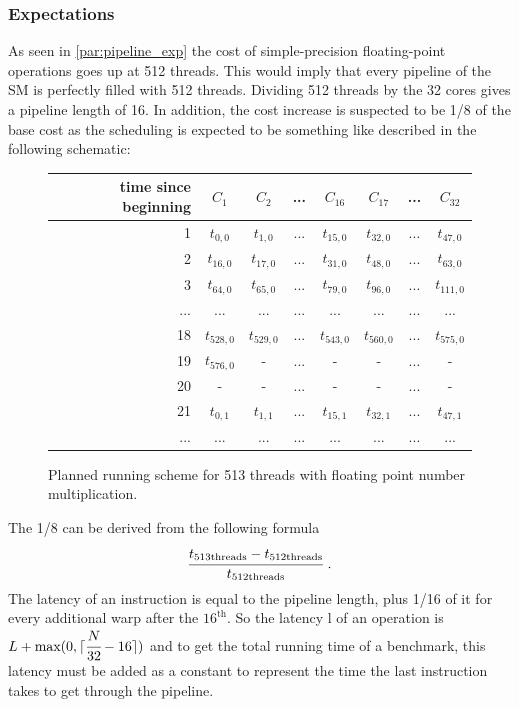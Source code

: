 \documentclass{report}
\DeclarePairedDelimiter\ceil{\lceil}{\rceil}
\begin{document}
	\subsubsection{Expectations}
	As seen in \ref{par:pipeline_exp} the cost of simple-precision floating-point
    operations goes up at 512 threads. This would imply that every pipeline of
    the SM is perfectly filled with 512 threads. Dividing 512 threads by
    the 32 cores gives a pipeline length of 16. In addition, the cost increase
    is suspected to be 1/8 of the base cost as the scheduling is expected to be
    something like described in the following schematic:
    
    \begin{figure}[H]
      \centering
       \begin{tabular}{ | r || c | c | c | c || c | c | c | }
    	    \hline
    	    time since beginning & $C_1$ & $C_2$ & ... & $C_{16}$ & $C_{17}$ & ... & $C_{32}$ \\ \hline  \hline
    	   1 & $t_{0,0}$ & $t_{1,0}$ & ... & $t_{15,0}$ & $t_{32, 0}$ & ... & $t_{47, 0}$ \\ \hline 
    	   2 & $t_{16,0}$ & $t_{17,0}$ & ... & $t_{31,0}$ & $t_{48, 0}$ & ... & $t_{63, 0}$ \\ \hline
    	   3 & $t_{64,0}$ & $t_{65,0}$ & ... & $t_{79,0}$ & $t_{96, 0}$ & ... & $t_{111, 0}$ \\ \hline
    	   ... & ... & ... & ... & ... & ... & ... & ... \\ \hline
    	   18 & $t_{528,0}$ & $t_{529,0}$ & ... & $t_{543,0}$ & $t_{560,0}$ & ... & $t_{575, 0}$ \\ \hline
    	   19 & $t_{576,0}$ & - & ... & - & - & ... & - \\ \hline
    	   20 & - & - & ... & - & - & ... & - \\ \hline
    	   21 & $t_{0,1}$ & $t_{1,1}$ & ... & $t_{15,1}$ & $t_{32,1}$ & ... & $t_{47,1}$ \\ \hline
    	   ... & ... & ... & ... & ... & ... & ... & ... \\ \hline
  	\end{tabular}
  	\captionsetup{justification=centering}
  	\caption{Planned running scheme for 513 threads with floating point number multiplication.}
  	\label{fig:fp_prediction_513}
   \end{figure}

    The 1/8 can be derived from the following formula
    \[ \cfrac{t_{\text{513threads}} - t_{\text{512threads}}}{t_{\text{512threads}}} \text{  .}\]
    The latency of an instruction is equal to the pipeline length, plus 1/16 of
    it for every additional warp after the $16^{\text{th}}$. So the latency l of an 
    operation is $L + \text{max}(0, \ceil{\cfrac{N}{32} -16})$ and to get the total
    running time of a benchmark, this latency must be added as a constant to
    represent the time the last instruction takes to get through the pipeline.
\end{document}
